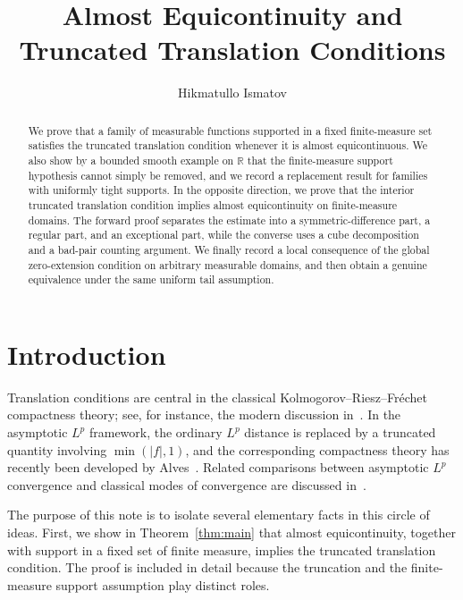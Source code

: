 \documentclass[11pt]{article}
\title{Almost Equicontinuity and Truncated Translation Conditions}
\author{Hikmatullo Ismatov}
\date{}
\theoremstyle{plain}
\theoremstyle{definition}
\theoremstyle{remark}
\newcommand{\R}{\mathbb{R}}
\begin{document}
\maketitle

\begin{abstract}
We prove that a family of measurable functions supported in a fixed
finite-measure set satisfies the truncated translation condition whenever it is
almost equicontinuous. We also show by a bounded smooth example on $\R$ that
the finite-measure support hypothesis cannot simply be removed, and we record
a replacement result for families with uniformly tight supports. In the opposite
direction, we prove that the interior truncated translation condition implies
almost equicontinuity on finite-measure domains. The forward proof separates
the estimate into a symmetric-difference part, a regular part, and an
exceptional part, while the converse uses a cube decomposition and a
bad-pair counting argument. We finally record a local consequence of the
global zero-extension condition on arbitrary measurable domains, and then
obtain a genuine equivalence under the same uniform tail assumption.
\end{abstract}

\section{Introduction}

Translation conditions are central in the classical
Kolmogorov--Riesz--Fréchet compactness theory; see, for instance, the modern
discussion in~\cite{HancheOlsenHolden}. In the asymptotic $L^p$ framework,
the ordinary $L^p$ distance is replaced by a truncated quantity involving
$\min(|f|,1)$, and the corresponding compactness theory has recently been
developed by Alves~\cite{AlvesKR,AlvesF}. Related comparisons between
asymptotic $L^p$ convergence and classical modes of convergence are discussed
in~\cite{AlvesOniani}.

The purpose of this note is to isolate several elementary facts in this circle
of ideas. First, we show in Theorem~\ref{thm:main} that almost
equicontinuity, together with support in a fixed set of finite measure,
implies the truncated translation condition. The proof is included in detail
because the truncation and the finite-measure support assumption play distinct
roles.
\end{document}
